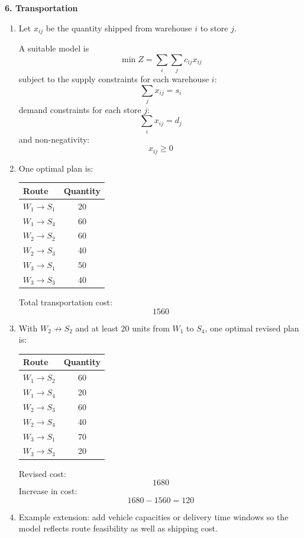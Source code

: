 \documentclass[11pt,a4paper]{article}
\begin{document}
\textbf{6. Transportation}

\begin{enumerate}
\item Let $x_{ij}$ be the quantity shipped from warehouse $i$ to store $j$.

A suitable model is
\[
\min Z = \sum_i \sum_j c_{ij}x_{ij}
\]
subject to the supply constraints for each warehouse $i$:
\[
\sum_j x_{ij} = s_i
\]
demand constraints for each store $j$:
\[
\sum_i x_{ij} = d_j
\]
and non-negativity:
\[
x_{ij}\ge 0
\]

\item One optimal plan is:

\begin{center}
\begin{tabular}{lc}
\toprule
Route & Quantity \\
\midrule
$W_1 \to S_1$ & 20 \\
$W_1 \to S_4$ & 60 \\
$W_2 \to S_2$ & 60 \\
$W_2 \to S_3$ & 40 \\
$W_3 \to S_1$ & 50 \\
$W_3 \to S_3$ & 40 \\
\bottomrule
\end{tabular}
\end{center}

Total transportation cost:
\[
1560
\]

\item With $W_2 \not\to S_2$ and at least 20 units from $W_1$ to $S_4$, one optimal revised plan is:

\begin{center}
\begin{tabular}{lc}
\toprule
Route & Quantity \\
\midrule
$W_1 \to S_2$ & 60 \\
$W_1 \to S_4$ & 20 \\
$W_2 \to S_3$ & 60 \\
$W_2 \to S_4$ & 40 \\
$W_3 \to S_1$ & 70 \\
$W_3 \to S_3$ & 20 \\
\bottomrule
\end{tabular}
\end{center}

Revised cost:
\[
1680
\]
Increase in cost:
\[
1680-1560=120
\]

\item Example extension: add vehicle capacities or delivery time windows so the model reflects route feasibility as well as shipping cost.
\end{enumerate}
\end{document}
